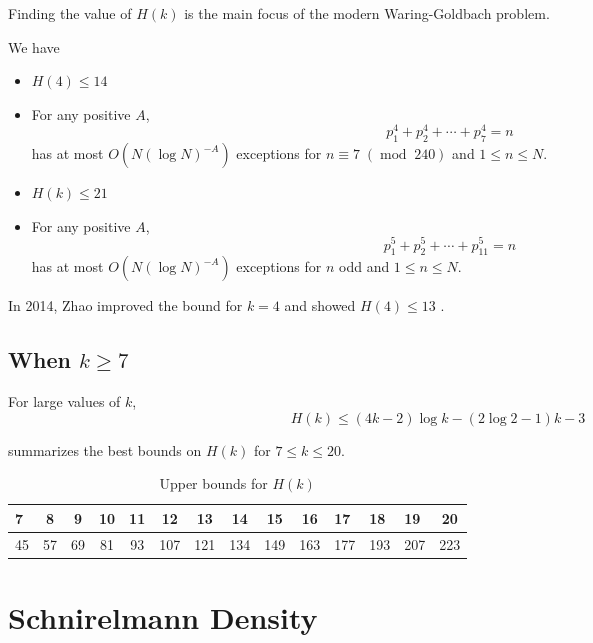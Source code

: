 Finding the value of $H(k)$ is the main focus of the modern Waring-Goldbach problem.

\begin{theorem} We have
    \begin{itemize}
        \item $H(4)\le14$
        \item For any positive $A$,
        $$p_1^4+p_2^4+\cdots+p_7^4=n$$
        has at most $O(N(\log N)^{-A})$ exceptions for $n\equiv 7\;(\operatorname{mod}\; 240)$ and $1\le n\le N$.
        \item $H(k)\le21$
        \item For any positive $A$,
        $$p_1^5+p_2^5+\cdots+p_{11}^5=n$$
        has at most $O(N(\log N)^{-A})$ exceptions for $n$ odd and $1\le n\le N$.
    \end{itemize}
\end{theorem}

 In 2014, Zhao improved the bound for $k=4$ and showed $H(4)\le 13$ \cite{https://doi.org/10.1112/plms/pdt072}.

\subsection{When $k\ge7$}

\begin{theorem} For large values of $k$,
\begin{equation}
    H(k)\le(4k-2)\log k-(2\log  2-1)k-3
\end{equation}

 summarizes the best bounds on $H(k)$ for $7\le k\le20$.

\begin{table}[ht]
    \centering
    \begin{tabular}{|l|c|c|c|c|c|c|c|c|c|l|l|l|c|}
        \hline
          7&8&  9&  10&  11&  12&  13&  14&  15&  16&    17&18&19&20\\
        \hline
          45&57&  69&  81&  93&  107&  121&  134&  149&  163&    177&193&207&223\\
        \hline
        \end{tabular}
    \caption{Upper bounds for $H(k)$}
    \label{tab:Hkbounds}
\end{table}

\end{theorem}

\section{Schnirelmann Density}


